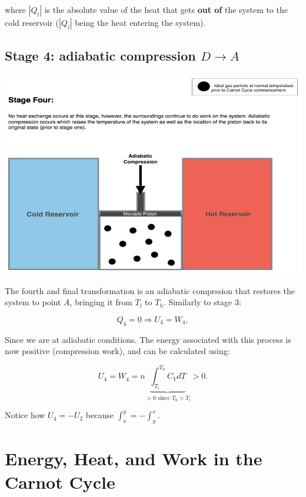 \documentclass[
  9pt,
]{extbook}
\theoremstyle{definition}
\theoremstyle{definition}
\theoremstyle{definition}
\theoremstyle{remark}
\begin{document}
where \(\left| Q_l \right|\) is the absolute value of the heat that gets \textbf{out of} the system to the cold reservoir (\(\left| Q_l \right|\) being the heat entering the system).

\hypertarget{CCstage4}{%
\subsection{\texorpdfstring{Stage 4: adiabatic compression \(D \rightarrow A\)}{Stage 4: adiabatic compression D \textbackslash rightarrow A}}\label{CCstage4}}

\begin{center}\includegraphics[width=0.7\linewidth]{./img/OEP_Figures.007d} \end{center}

The fourth and final transformation is an adiabatic comprssion that restores the system to point \(A\), bringing it from \(T_l\) to \(T_h\). Similarly to stage 3:

\begin{equation}
Q_4 = 0 \Rightarrow U_4 = W_4,
  \label{eq:CCst4}
\end{equation}

Since we are at adiabatic conditions. The energy associated with this process is now positive (compression work), and can be calculated using:

\begin{equation}
U_4 = W_4 = n \underbrace{\int_{T_l}^{T_h} C_V dT}_{>0 \text{ since } T_\mathrm{h}>T_\mathrm{l}} > 0.
  \label{eq:CCst4b}
\end{equation}

Notice how \(U_4 = -U_2\) because \(\int_x^y=-\int_y^x\).

\hypertarget{UWQCarnot}{%
\section{Energy, Heat, and Work in the Carnot Cycle}\label{UWQCarnot}}
\end{document}
